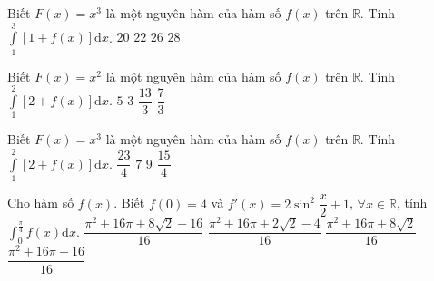 \begin{ex}%
	Biết $F(x) = x^3$ là một nguyên hàm của hàm số $f(x)$ trên $\mathbb{R}$. Tính $\displaystyle\int\limits_{1}^{3} \left[ 1 + f(x) \right] \mathrm{d}x$.
	\choice
	{$20$}
	{$22$}
	{$26$}
	{\True $28$}

\end{ex}
\begin{ex}%
	Biết $F(x) = x^2$ là một nguyên hàm của hàm số $f(x)$ trên $\mathbb{R}$. Tính $\displaystyle\int\limits_{1}^{2} \left[ 2 + f(x) \right] \mathrm{d}x$.
	\choice
	{\True$5$}
	{$3$}
	{$\dfrac{13}{3}$}
	{$\dfrac{7}{3}$}
\end{ex}
\begin{ex}%
	Biết $F(x) = x^3$ là một nguyên hàm của hàm số $f(x)$ trên $\mathbb{R}$. Tính $\displaystyle\int\limits_{1}^{2} \left[ 2 + f(x) \right] \mathrm{d}x$.
	\choice
	{$\dfrac{23}{4}$}
	{$7$}
	{\True$9$}
	{$\dfrac{15}{4}$}
\end{ex}
\begin{ex}%
	Cho hàm số $f(x)$. Biết $f(0) = 4$ và $f'(x) = 2 \sin^2 \dfrac{x}{2} + 1$, $\forall x \in \mathbb{R}$, tính $\displaystyle\int_{0}^{\frac{\pi}{4}} f(x) \mathrm{d}x$.
	\choice
	{\True $\dfrac{\pi^2 + 16\pi + 8\sqrt{2} - 16}{16}$}
	{$\dfrac{\pi^2 + 16\pi + 2\sqrt{2} - 4}{16}$}
	{$\dfrac{\pi^2 + 16\pi + 8\sqrt{2}}{16}$}
	{$\dfrac{\pi^2 + 16\pi - 16}{16}$}
\end{ex}
